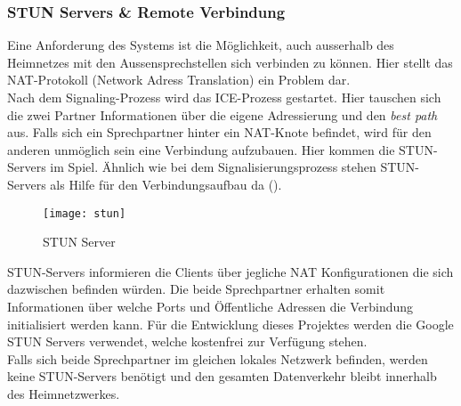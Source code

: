 \subsubsection{STUN Servers \& Remote Verbindung}
\label{test}
Eine Anforderung des Systems ist die Möglichkeit, auch ausserhalb des Heimnetzes mit den Aussensprechstellen sich verbinden zu können. Hier stellt das NAT-Protokoll (Network Adress Translation) ein Problem dar.
\\
Nach dem Signaling-Prozess wird das ICE-Prozess gestartet. Hier tauschen sich die zwei Partner Informationen über die eigene Adressierung und den \textit{best path} aus. Falls sich ein Sprechpartner hinter ein NAT-Knote befindet, wird für den anderen unmöglich sein eine Verbindung aufzubauen. Hier kommen die STUN-Servers im Spiel. Ähnlich wie bei dem Signalisierungsprozess stehen STUN-Servers als Hilfe für den Verbindungsaufbau da (). 
\begin{figure}[htb!]
	\begin{center}
		\texttt{[image: stun]}
		\caption[STUN Server]{STUN Server}
		\label{fig:stun}
	\end{center}
\end{figure}
 STUN-Servers informieren die Clients über jegliche NAT Konfigurationen die sich dazwischen befinden würden. Die beide Sprechpartner erhalten somit Informationen über welche Ports und Öffentliche Adressen die Verbindung initialisiert werden kann. Für die Entwicklung dieses Projektes werden die Google STUN Servers verwendet, welche kostenfrei zur Verfügung stehen.
\\
Falls sich beide Sprechpartner im gleichen lokales Netzwerk befinden, werden keine STUN-Servers benötigt und den gesamten Datenverkehr bleibt innerhalb des Heimnetzwerkes.

\newpage